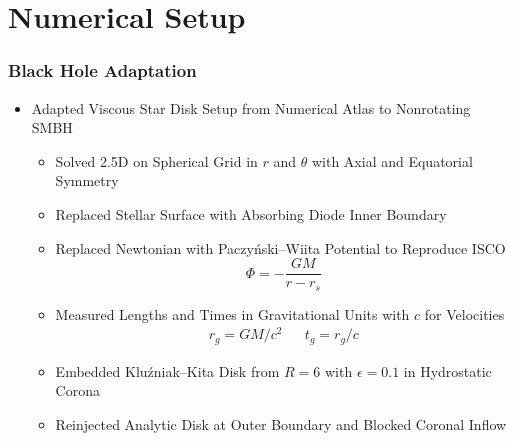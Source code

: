 	\section{Numerical Setup}

	\begin{frame}
		\frametitle{Black Hole Adaptation}
		\begin{itemize}
			\item<2-> Adapted Viscous Star Disk Setup from Numerical Atlas to Nonrotating SMBH
			\begin{itemize}
				\item<3-> Solved 2.5D on Spherical Grid in $r$ and $\theta$ with Axial and Equatorial Symmetry
				\item<4-> Replaced Stellar Surface with Absorbing Diode Inner Boundary
				\item<5-> Replaced Newtonian with Paczyński–Wiita Potential to Reproduce ISCO
						  $$\Phi = -\frac{GM}{r - r_s}$$
				\item<6-> Measured Lengths and Times in Gravitational Units with $c$ for Velocities
						  \begin{align*}&&&& r_g = GM / c^2 && t_g = r_g / c &&&&\end{align*}
				\item<7-> Embedded Kluźniak–Kita Disk from $R = 6$ with $\epsilon = 0.1$ in Hydrostatic Corona
				\item<8-> Reinjected Analytic Disk at Outer Boundary and Blocked Coronal Inflow
			\end{itemize}
		\end{itemize}
	\end{frame}

